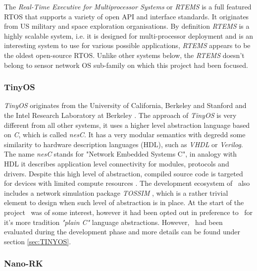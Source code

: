  The \emph{Real-Time Executive for Multiprocessor Systems} or \emph{RTEMS} is a
 full featured RTOS that supports a variety of open API and interface standards.
 It originates from US military and space exploration organisations. By definition
 \emph{RTEMS} is a highly scalable system, i.e. it is designed for multi-processor 
 deployment and is an interesting system to use for various possible applications,
 \emph{RTEMS} appears to be the oldest open-source RTOS. Unlike other systems below,
 the \emph{RTEMS} doesn't belong to sensor network OS sub-family on which this
 project had been focused. 


\subsubsection{TinyOS} \label{sec:rtos:tinyos}

 \emph{TinyOS} originates from the University of California, Berkeley and
 Stanford and the Intel Research Laboratory at Berkeley \cite{links:wiki:tinyos,
 links:tinyos:webs, links:tinyos:homepage}. The approach of \emph{TinyOS}
 is very different from all other systems, it uses a higher level abstraction
 language based on \emph{C}, which is called \emph{nesC}. It has a very
 modular semantics with degredd some similarity to hardware description
 languages (HDL), such as \emph{VHDL} or \emph{Verilog}. The name \emph{nesC}
 stands for "Network Embedded Systems C", in analogy with HDL it describes
 application level connectivity for modules, protocols and drivers. Despite
 this high level of abstraction, compiled source code is targeted for devices
 with limited compute resources \cite{links:tinyos:nesc}. The development
 ecosystem of \TinyOS\ also includes a network simulation package \emph{TOSSIM}
 \cite{links:tinyos:tossim}, which is a rather trivial element to design when
 such level of abstraction is in place. At the start of the project \TinyOS\
 was of some interest, however it had been opted out in preference to \Contiki\
 for it's more tradition \emph{"plain C"} language abstractions. However,
 \TinyOS\ had been evaluated during the development phase and more details
 can be found under section \ref{sec:TINYOS}.



\subsubsection{Nano-RK} \label{sec:rtos:nanork}

